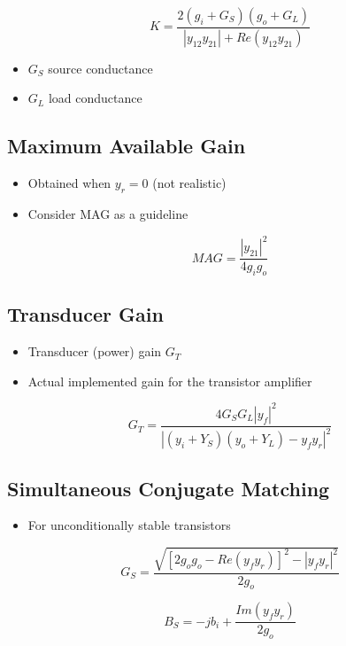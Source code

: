 \begin{equation}
K = \dfrac{2(g_i+G_S)(g_o+G_L)}{|y_{12}y_{21}|+Re(y_{12}y_{21})}
\end{equation}

\begin{itemize}
	\item $G_S$ source conductance
	\item $G_L$ load conductance
\end{itemize}

\subsection{Maximum Available Gain}
\begin{itemize}
	\item Obtained when $y_r=0$ (not realistic) 
	\item Consider MAG as a guideline
\end{itemize}

\begin{equation}
MAG = \dfrac{|y_{21}|^2}{4g_ig_o}
\end{equation}

\subsection{Transducer Gain}
\begin{itemize}
	\item Transducer (power) gain $G_T$
	\item Actual implemented gain for the transistor amplifier
\end{itemize}

\begin{equation}
G_T = \dfrac{4 G_S G_L |y_f|^2}{|(y_i+Y_S)(y_o+Y_L)-y_fy_r|^2}
\end{equation}

\subsection{Simultaneous Conjugate Matching}
\begin{itemize}
	\item For unconditionally stable transistors
\end{itemize}

\begin{equation}
G_S=\dfrac{\sqrt{[2g_og_o-Re(y_fy_r)]^2-|y_fy_r|^2}}{2g_o}
\end{equation}

\begin{equation}
B_S=-jb_i+\dfrac{Im(y_fy_r)}{2g_o}
\end{equation}

